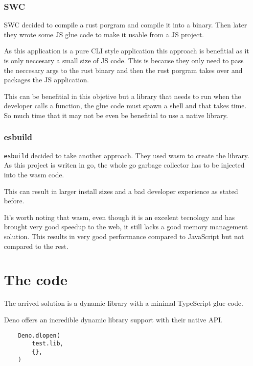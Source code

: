 \documentclass[12pt, letterpaper]{article}
\begin{document}
\begin{multicols}{2}
    \subsubsection{SWC}

    SWC decided to compile a rust porgram and compile it into a binary. Then later they wrote some JS glue code to make it usable from a JS project.

    As this application is a pure CLI style application this approach is benefitial as it is only neccesary a small size of JS code. This is because they only need to pass the neccesary args to the rust binary and then the rust porgram takes over and packages the JS application.

    This can be benefitial in this objetive but a library that needs to run when the developer calls a function, the glue code must spawn a shell and that takes time. So much time that it may not be even be benefitial to use a native library.

    \subsubsection{esbuild}

    \verb|esbuild| decided to take another approach. They used wasm to create the library. As this project is writen in go, the whole go garbage collector has to be injected into the wasm code.

    This can result in larger install sizes and a bad developer experience as stated before.

    It's worth noting that wasm, even though it is an excelent tecnology and has brought very good speedup to the web, it still lacks a good memory management solution. This results in very good performance compared to JavaScript but not compared to the rest.

    \section{The code}

    The arrived solution is a dynamic library with a minimal TypeScript glue code.

    Deno offers an incredible dynamic library support with their native API.

    \begin{lstlisting}
    Deno.dlopen(
        test.lib,
        {},
    )
    \end{lstlisting}


\end{multicols}
\end{document}
